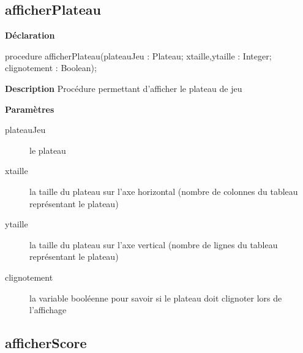 \documentclass{report}
\newif\ifpdf
\begin{document}
\subsection*{afficherPlateau}
\fi
\label{Affichage-afficherPlateau}
\begin{list}{}{
\setlength{\itemindent}{0cm}
\setlength{\listparindent}{0cm}
\setlength{\leftmargin}{\evensidemargin}
\addtolength{\leftmargin}{\tmplength}
\settowidth{\labelsep}{X}
\addtolength{\leftmargin}{\labelsep}
\setlength{\labelwidth}{\tmplength}
}
\item[\textbf{Déclaration}\hfill]
\ifpdf
\begin{flushleft}
\fi
\begin{ttfamily}
procedure afficherPlateau(plateauJeu : Plateau; xtaille,ytaille : Integer; clignotement : Boolean);\end{ttfamily}

\ifpdf
\end{flushleft}
\fi

\par
\item[\textbf{Description}]
Procédure permettant d'afficher le plateau de jeu    \par
\item[\textbf{Paramètres}]
\begin{description}
\item[plateauJeu] le plateau
\item[xtaille] la taille du plateau sur l'axe horizontal (nombre de colonnes du tableau représentant le plateau)
\item[ytaille] la taille du plateau sur l'axe vertical (nombre de lignes du tableau représentant le plateau)
\item[clignotement] la variable booléenne pour savoir si le plateau doit clignoter lors de l'affichage
\end{description}


\end{list}
\ifpdf
\subsection*{\large{\textbf{afficherScore}}\normalsize\hspace{1ex}\hrulefill}
\else
\end{document}
